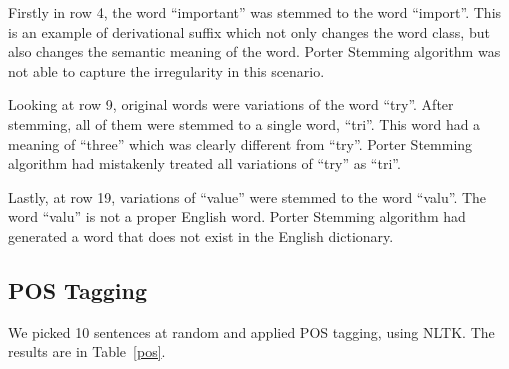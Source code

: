 Firstly in row 4, the word ``important'' was stemmed to the word ``import''.
This is an example of derivational suffix which not only changes the word class,
but also changes the semantic meaning of the word. Porter Stemming algorithm was
not able to capture the irregularity in this scenario. 

Looking at row 9, original words were variations of the word ``try''. After
stemming, all of them were stemmed to a single word, ``tri''. This word had a
meaning of ``three'' which was clearly different from ``try''. Porter Stemming
algorithm had mistakenly treated all variations of ``try'' as ``tri''.

Lastly, at row 19, variations of ``value'' were stemmed to the word ``valu''.
The word ``valu'' is not a proper English word. Porter Stemming algorithm had
generated a word that does not exist in the English dictionary.

\subsection{POS Tagging}

We picked 10 sentences at random and applied POS tagging, using NLTK\@.
The results are in Table~\ref{pos}.

